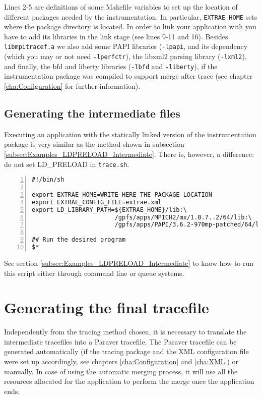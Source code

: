Lines 2-5 are definitions of some Makefile variables to set up the location of different packages needed by the instrumentation. In particular, {\tt EXTRAE\_HOME} sets where the \TRACE package directory is located. In order to link your application with \TRACE you have to add its libraries in the link stage (see lines 9-11 and 16). Besides {\tt libmpitracef.a} we also add some PAPI libraries ({\tt -lpapi}, and its dependency (which you may or not need {\tt -lperfctr}), the libxml2 parsing library ({\tt -lxml2}), and finally, the bfd and liberty libraries ({\tt -lbfd} and {\tt -liberty}), if the instrumentation package was compiled to support merge after trace (see chapter \ref{cha:Configuration} for further information).

\subsection{Generating the intermediate files}\label{subsec:Examples_static_Intermediate}

Executing an application with the statically linked version of the instrumentation package is very similar as the method shown in subsection \ref{subsec:Examples_LDPRELOAD_Intermediate}. There is, however, a difference: do not set LD\_PRELOAD in {\tt trace.sh}.

\begin{Verbatim}[frame=single,numbers=left,labelposition=topline,label=trace.sh]
#!/bin/sh

export EXTRAE_HOME=WRITE-HERE-THE-PACKAGE-LOCATION
export EXTRAE_CONFIG_FILE=extrae.xml
export LD_LIBRARY_PATH=${EXTRAE_HOME}/lib:\
                       /gpfs/apps/MPICH2/mx/1.0.7..2/64/lib:\
                       /gpfs/apps/PAPI/3.6.2-970mp-patched/64/lib

## Run the desired program
$*
\end{Verbatim}

See section \ref{subsec:Examples_LDPRELOAD_Intermediate} to know how to run this script either through command line or queue systems.

\section{Generating the final tracefile}\label{subsec:Examples_LDPRELOAD_Final}

Independently from the tracing method chosen, it is necessary to translate the intermediate tracefiles into a Paraver tracefile. The Paraver tracefile can be generated automatically (if the tracing package and the XML configuration file were set up accordingly, see chapters \ref{cha:Configuration} and \ref{cha:XML}) or manually. In case of using the automatic merging process, it will use all the resources allocated for the application to perform the merge once the application ends.

